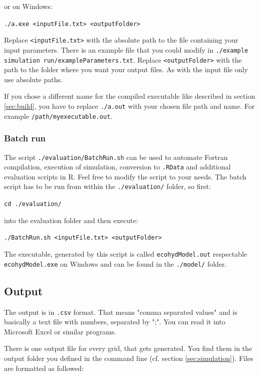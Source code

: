or on Windows:

\texttt{./a.exe <inputFile.txt> <outputFolder>}

Replace \texttt{<inputFile.txt>} with the absolute path to the file containing your input parameters. There is an example file that you could modify in  \texttt{./example simulation run/exampleParameters.txt}. Replace \texttt{<outputFolder>} with the path to the folder where you want your output files. As with the input file only use absolute paths.

If you chose a different name for the compiled executable like described in section \ref{sec:build}, you have to replace \texttt{./a.out} with your chosen file path and name. For example \texttt{/path/myexecutable.out}.




\subsubsection{Batch run \label{sec:batchrun}}

The script \texttt{./evaluation/BatchRun.sh} can be used to automate Fortran compilation, execution of simulation, conversion to \texttt{.RData} and additional evaluation scripts in R. Feel free to modify the script to your needs. The batch script has to be run from within the \texttt{./evaluation/} folder, so first:

\texttt{cd ./evaluation/}

into the evaluation folder and then execute:

\texttt{./BatchRun.sh <inputFile.txt> <outputFolder>}

The executable, generated by this script is called \texttt{ecohydModel.out} respectable \texttt{ecohydModel.exe} on Windows and can be found in the \texttt{./model/} folder.

\subsection{Output \label{sec:output}}

The output is in \texttt{.csv} format. That means "comma separated values" and is basically a text file with numbers, separated by ";". You can read it into Microsoft Excel or similar programs.

There is one output file for every grid, that gets generated. You find them in the output folder you defined in the command line (cf. section \ref{sec:simulation}). Files are formatted as followed:


